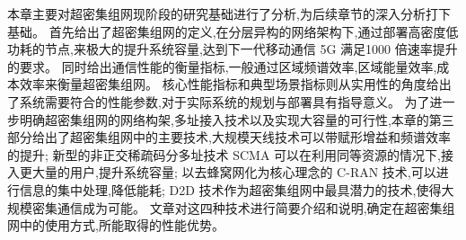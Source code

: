 本章主要对超密集组网现阶段的研究基础进行了分析,为后续章节的深入分析打下基础。
首先给出了超密集组网的定义,在分层异构的网络架构下,通过部署高密度低功耗的节点,来极大的提升系统容量,达到下一代移动通信 5G 满足1000 倍速率提升的要求。
同时给出通信性能的衡量指标,一般通过区域频谱效率,区域能量效率,成本效率来衡量超密集组网。
核心性能指标和典型场景指标则从实用性的角度给出了系统需要符合的性能参数,对于实际系统的规划与部署具有指导意义。
为了进一步明确超密集组网的网络构架,多址接入技术以及实现大容量的可行性,本章的第三部分给出了超密集组网中的主要技术,大规模天线技术可以带赋形增益和频谱效率的提升;
新型的非正交稀疏码分多址技术 SCMA 可以在利用同等资源的情况下,接入更大量的用户,提升系统容量;
以去蜂窝网化为核心理念的 C-RAN 技术,可以进行信息的集中处理,降低能耗;
D2D 技术作为超密集组网中最具潜力的技术,使得大规模密集通信成为可能。
文章对这四种技术进行简要介绍和说明,确定在超密集组网中的使用方式,所能取得的性能优势。
